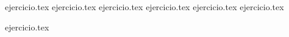 \begin{enumerate}
    \setcounter{enumi}{17}
    {ejercicio.tex}
    {ejercicio.tex}
    {ejercicio.tex}
    {ejercicio.tex}
    {ejercicio.tex}
    {ejercicio.tex}
\end{enumerate}

\vspace{1em}
\begin{enumerate}
    \setcounter{enumi}{23}
    {ejercicio.tex}
\end{enumerate}
